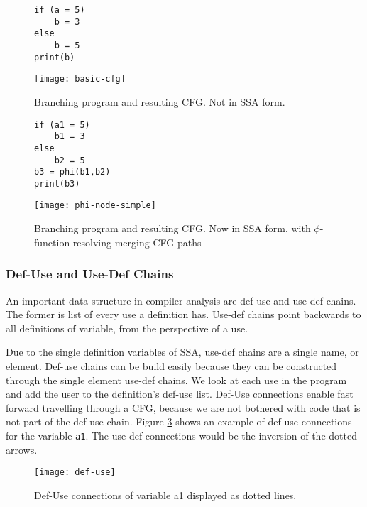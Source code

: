 \begin{figure}[t]
	\begin{minipage}{0.4\textwidth}
		\begin{lstlisting}[style=c]
if (a = 5)
	b = 3
else
	b = 5
print(b)
		\end{lstlisting}
	\end{minipage}\hfill
	\begin{minipage} {0.45\textwidth}
			\texttt{[image: basic-cfg]}
	\end{minipage}
\caption{Branching program and resulting CFG. Not in SSA form.}
\label{simple-cfg}
\end{figure}
\begin{figure}[t]
	\begin{minipage}{0.4\textwidth}
		\begin{lstlisting}[style=c]
if (a1 = 5)
	b1 = 3
else
	b2 = 5
b3 = phi(b1,b2)
print(b3)
		\end{lstlisting}
	\end{minipage}\hfill
	\begin{minipage} {0.45\textwidth}
		\texttt{[image: phi-node-simple]}
	\end{minipage}
	\caption{Branching program and resulting CFG. Now in SSA form, with $\phi$-function resolving merging CFG paths}
	\label{simple-phi}
\end{figure}
\subsubsection{Def-Use and Use-Def Chains}
An important data structure in compiler analysis are def-use and use-def chains. The former is list of every use a definition has. Use-def chains point backwards to all definitions of variable, from the perspective of a use.  

Due to the single definition variables of SSA, use-def chains are a single name, or element. Def-use chains can be build easily because they can be constructed through the single element use-def chains. We look at each use in the program and add the user to the definition's def-use list. Def-Use connections enable fast forward travelling through a CFG, because we are not bothered with code that is not part of the def-use chain. Figure \ref{def-use} shows an example of def-use connections for the variable \verb|a1|. The use-def connections would be the inversion of the dotted arrows.
\begin{figure}[t]
	\centering
	\texttt{[image: def-use]}
	\caption{Def-Use connections of variable a1 displayed as dotted lines.}
	\label{def-use}
\end{figure}

